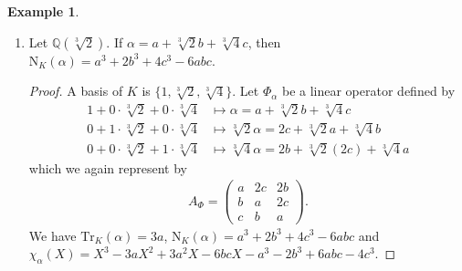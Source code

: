 \documentclass[a4paper]{book}
\theoremstyle{definition}
\newtheorem{example}{Example}[definition]
\begin{document}
\begin{example}
\begin{enumerate}
\begin{proof}
        \begin{align*}
            A_{\Phi} = \begin{pmatrix}
                a & db \\
                b & a
            \end{pmatrix} \text{.}
        \end{align*}
        We have \(\mathrm{Tr}_K(\alpha) = 2a\), \(\mathrm{N}_K(\alpha) = a^2 - db^2\), and \(\chi_\alpha(X) = X^2 - 2aX + a^2 - d b^2\) matching the results in our previous examples.
    \end{proof}
    \item Let \(\mathbb{Q}(\sqrt[3]{2})\). If \(\alpha = a + \sqrt[3]{2} b + \sqrt[3]{4} c\), then \(\mathrm{N}_K(\alpha) = a^3 + 2b^3 + 4c^3 - 6abc\).
    \begin{proof}
        A basis of \(K\) is \(\{1, \sqrt[3]{2}, \sqrt[3]{4}\}\). Let \(\Phi_\alpha\) be a linear operator defined by
        \begin{align*}
            1 + 0 \cdot \sqrt[3]{2} + 0 \cdot \sqrt[3]{4} &\mapsto \alpha = a + \sqrt[3]{2} b + \sqrt[3]{4} c \\
            0 + 1 \cdot \sqrt[3]{2} + 0 \cdot \sqrt[3]{4} &\mapsto \sqrt[3]{2} \alpha = 2 c + \sqrt[3]{2}a + \sqrt[3]{4} b \\
            0 + 0 \cdot \sqrt[3]{2} + 1 \cdot \sqrt[3]{4} & \mapsto \sqrt[3]{4} \alpha = 2b + \sqrt[3]{2} (2c) + \sqrt[3]{4} a
        \end{align*}
        which we again represent by
        \begin{align*}
            A_\Phi = 
            \begin{pmatrix}
                a & 2c & 2b \\
                b & a & 2c \\
                c & b & a
            \end{pmatrix} \text{.}
        \end{align*}
        We have \(\mathrm{Tr}_K(\alpha) = 3a\), \(\mathrm{N}_K(\alpha) = a^3 + 2b^3 + 4c^3 - 6abc\) and \(\chi_\alpha(X) = X^3 - 3aX^2 + 3a^2X - 6bcX - a^3 -2b^3 + 6abc - 4c^3\).
    \end{proof}
    \end{enumerate}
\end{example}
\end{document}
